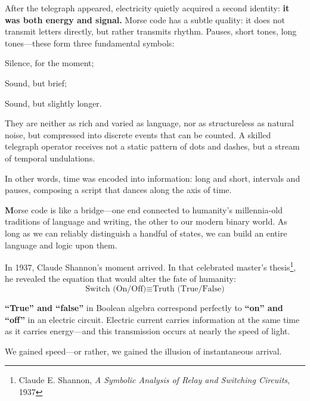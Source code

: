 \vspace{1em}

After the telegraph appeared, electricity quietly acquired a second identity: \textbf{it was both energy and signal.} Morse code has a subtle quality: it does not transmit letters directly, but rather transmits rhythm. Pauses, short tones, long tones---these form three fundamental symbols:

\vspace{1em}

Silence, for the moment;

Sound, but brief;

Sound, but slightly longer.

\vspace{1em}

They are neither as rich and varied as language, nor as structureless as natural noise, but compressed into discrete events that can be counted. A skilled telegraph operator receives not a static pattern of dots and dashes, but a stream of temporal undulations.

In other words, time was encoded into information: long and short, intervals and pauses, composing a script that dances along the axis of time.

\textbf{M}orse code is like a bridge---one end connected to humanity's millennia-old traditions of language and writing, the other to our modern binary world. As long as we can reliably distinguish a handful of states, we can build an entire language and logic upon them.

In 1937, Claude Shannon's moment arrived. In that celebrated master's thesis\footnote{Claude E. Shannon, \textit{A Symbolic Analysis of Relay and Switching Circuits}, 1937}, he revealed the equation that would alter the fate of humanity:
\begin{equation*}
\text{Switch (On/Off)} \equiv \text{Truth (True/False)}
\end{equation*}

\textbf{``True'' and ``false''} in Boolean algebra correspond perfectly to \textbf{``on'' and ``off''} in an electric circuit. Electric current carries information at the same time as it carries energy---and this transmission occurs at nearly the speed of light.

\begin{importantbox}
We gained speed---or rather, we gained the illusion of instantaneous arrival.
\end{importantbox}

